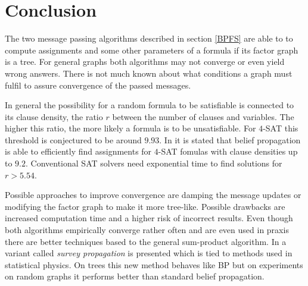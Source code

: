 \section{Conclusion}
The two message passing algorithms described in section \ref{BPFS} are able to to compute assignments and some other parameters of a formula if its factor graph is a tree. For general graphs both algorithms may not converge or even yield wrong answers. There is not much known about what conditions a graph must fulfil to assure convergence of the passed messages.

In general the possibility for a random formula to be satisfiable is connected to its clause density, the ratio $r$ between the number of clauses and variables. The higher this ratio, the more likely a formula is to be unsatisfiable.
For $4$-SAT this threshold is  conjectured to be around $9.93$. In \cite{BPGuideMe} it is stated that belief propagation is able to efficiently find assignments for $4$-SAT fomulas with clause densities up to $9.2$. Conventional SAT solvers need exponential time to find solutions for $r > 5.54$.

Possible approaches to improve convergence are damping the message updates or modifying the factor graph to make it more tree-like. Possible drawbacks are increased computation time and a higher risk of incorrect results. \newline
Even though both algorithms empirically converge rather often and are even used in praxis there are better techniques based to the general sum-product algorithm. In \cite{survprob} a variant called \emph{survey propagation} is presented which is tied to methods used in statistical physics. On trees this new method behaves like BP but on experiments on random graphs it performs better than standard belief propagation. 